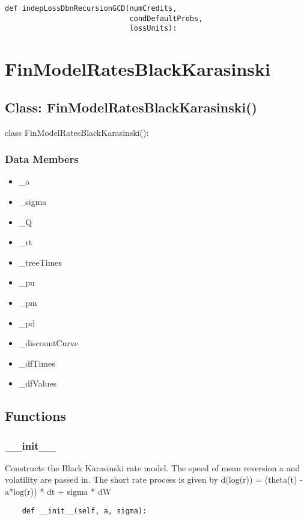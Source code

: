 \documentclass[twoside,11pt]{book}
\begin{document}
\begin{lstlisting}
def indepLossDbnRecursionGCD(numCredits,
                             condDefaultProbs,
                             lossUnits):
\end{lstlisting}

\newpage
\section{FinModelRatesBlackKarasinski}

\subsection*{Class: FinModelRatesBlackKarasinski()}
class FinModelRatesBlackKarasinski(): 

\subsubsection*{Data Members}
\begin{itemize}
\item{\_a}
\item{\_sigma}
\item{\_Q}
\item{\_rt}
\item{\_treeTimes}
\item{\_pu}
\item{\_pm}
\item{\_pd}
\item{\_discountCurve}
\item{\_dfTimes}
\item{\_dfValues}
\end{itemize}

\subsection*{Functions}

\subsubsection*{{\bf \_\_init\_\_}}
Constructs the Black Karasinski rate model. The speed of mean reversion a and volatility are passed in. The short rate process is given by d(log(r)) = (theta(t) - a*log(r)) * dt  + sigma * dW  

\begin{lstlisting}
    def __init__(self, a, sigma):
\end{lstlisting}
\end{document}
